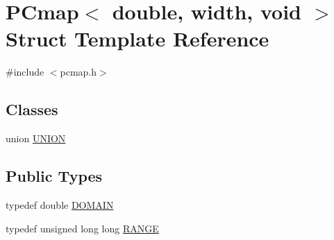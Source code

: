 \hypertarget{struct_p_cmap_3_01double_00_01width_00_01void_01_4}{}\section{P\+Cmap$<$ double, width, void $>$ Struct Template Reference}
\label{struct_p_cmap_3_01double_00_01width_00_01void_01_4}


{\ttfamily \#include $<$pcmap.\+h$>$}

\subsection*{Classes}
\begin{DoxyCompactItemize}
\item 
union \hyperlink{union_p_cmap_3_01double_00_01width_00_01void_01_4_1_1_u_n_i_o_n}{U\+N\+I\+O\+N}
\end{DoxyCompactItemize}
\subsection*{Public Types}
\begin{DoxyCompactItemize}
\item 
typedef double \hyperlink{struct_p_cmap_3_01double_00_01width_00_01void_01_4_acea4b293ccc18a675fd7dc227fd28891}{D\+O\+M\+A\+I\+N}
\item 
typedef unsigned long long \hyperlink{struct_p_cmap_3_01double_00_01width_00_01void_01_4_a6351f3fa8772b15ba03129e5fd7edce1}{R\+A\+N\+G\+E}
\end{DoxyCompactItemize}
